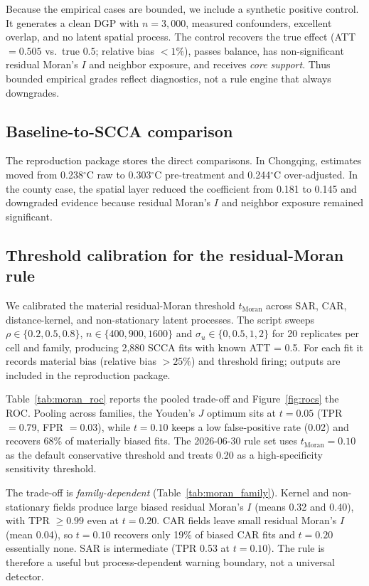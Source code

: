 \documentclass{article}
\begin{document}
Because the empirical cases are bounded, we include a synthetic positive control. It generates a clean DGP with $n=3{,}000$, measured confounders, excellent overlap, and no latent spatial process. The control recovers the true effect (ATT $=0.505$ vs.\ true $0.5$; relative bias $<1\%$), passes balance, has non-significant residual Moran's $I$ and neighbor exposure, and receives \emph{core support}. Thus bounded empirical grades reflect diagnostics, not a rule engine that always downgrades.

\subsection{Baseline-to-SCCA comparison}

The reproduction package stores the direct comparisons. In Chongqing, estimates moved from 0.238$^\circ$C raw to 0.303$^\circ$C pre-treatment and 0.244$^\circ$C over-adjusted. In the county case, the spatial layer reduced the coefficient from 0.181 to 0.145 and downgraded evidence because residual Moran's $I$ and neighbor exposure remained significant.

\subsection{Threshold calibration for the residual-Moran rule}
\label{sec:thresholdcalibration}

We calibrated the material residual-Moran threshold $t_{\mathrm{Moran}}$ across SAR, CAR, distance-kernel, and non-stationary latent processes. The script sweeps $\rho \in \{0.2, 0.5, 0.8\}$, $n \in \{400, 900, 1600\}$ and $\sigma_u \in \{0, 0.5, 1, 2\}$ for 20 replicates per cell and family, producing 2{,}880 SCCA fits with known ATT = 0.5. For each fit it records material bias (relative bias $> 25\%$) and threshold firing; outputs are included in the reproduction package.

Table~\ref{tab:moran_roc} reports the pooled trade-off and Figure~\ref{fig:rocs} the ROC. Pooling across families, the Youden's $J$ optimum sits at $t = 0.05$ (TPR $= 0.79$, FPR $= 0.03$), while $t=0.10$ keeps a low false-positive rate (0.02) and recovers 68\% of materially biased fits. The 2026-06-30 rule set uses $t_{\mathrm{Moran}}=0.10$ as the default conservative threshold and treats 0.20 as a high-specificity sensitivity threshold.

The trade-off is \emph{family-dependent} (Table~\ref{tab:moran_family}). Kernel and non-stationary fields produce large biased residual Moran's $I$ (means 0.32 and 0.40), with TPR $\geq 0.99$ even at $t=0.20$. CAR fields leave small residual Moran's $I$ (mean 0.04), so $t=0.10$ recovers only 19\% of biased CAR fits and $t=0.20$ essentially none. SAR is intermediate (TPR 0.53 at $t=0.10$). The rule is therefore a useful but process-dependent warning boundary, not a universal detector.
\end{document}
